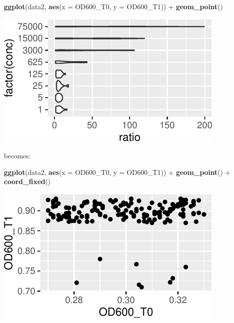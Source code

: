 \documentclass[]{book}
\newenvironment{Shaded}{}{}
\newcommand{\DataTypeTok}[1]{\textcolor[rgb]{0.56,0.13,0.00}{#1}}
\newcommand{\KeywordTok}[1]{\textcolor[rgb]{0.00,0.44,0.13}{\textbf{#1}}}
\newcommand{\NormalTok}[1]{#1}
\newcommand{\OperatorTok}[1]{\textcolor[rgb]{0.40,0.40,0.40}{#1}}
\newcommand{\StringTok}[1]{\textcolor[rgb]{0.25,0.44,0.63}{#1}}
\begin{document}
\begin{Shaded}
\begin{Highlighting}[]
\KeywordTok{ggplot}\NormalTok{(data2, }\KeywordTok{aes}\NormalTok{(}\DataTypeTok{x =}\NormalTok{ OD600_T0, }\DataTypeTok{y =}\NormalTok{ OD600_T1)) }\OperatorTok{+}
\StringTok{  }\KeywordTok{geom_point}\NormalTok{()}
\end{Highlighting}
\end{Shaded}

\begin{center}\includegraphics[width=\textwidth]{TRES-Tidy-Tutorial_files/figure-latex/unnamed-chunk-128-1} \end{center}

becomes:

\begin{Shaded}
\begin{Highlighting}[]
\KeywordTok{ggplot}\NormalTok{(data2, }\KeywordTok{aes}\NormalTok{(}\DataTypeTok{x =}\NormalTok{ OD600_T0, }\DataTypeTok{y =}\NormalTok{ OD600_T1)) }\OperatorTok{+}
\StringTok{  }\KeywordTok{geom_point}\NormalTok{() }\OperatorTok{+}
\StringTok{  }\KeywordTok{coord_fixed}\NormalTok{()}
\end{Highlighting}
\end{Shaded}

\begin{center}\includegraphics[width=\textwidth]{TRES-Tidy-Tutorial_files/figure-latex/unnamed-chunk-129-1} \end{center}
\end{document}
